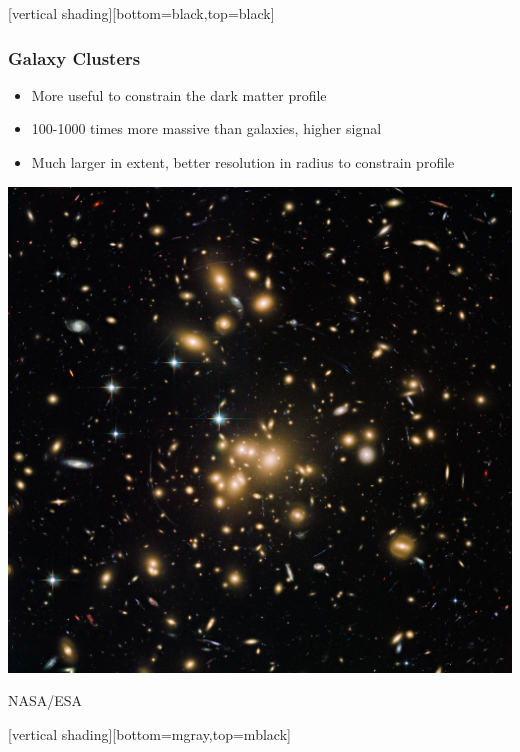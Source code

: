 \documentclass{beamer}
\begin{document}
{
    [vertical shading][bottom=black,top=black]


    \frame
    {
        \frametitle{Galaxy Clusters}

        \begin{itemize}

            \item More useful to constrain the dark matter profile

            \item 100-1000 times more massive than galaxies, higher signal

            \item Much larger in extent, better resolution in radius to
                constrain profile

        \end{itemize}
        \begin{center}
            \includegraphics[trim=0 300 0 500,clip,width=\textwidth]{abell1689_hubble_1280.jpg}
        \end{center}
            \hfill {\tiny NASA/ESA}
    }
    [vertical shading][bottom=mgray,top=mblack]
}
\end{document}
